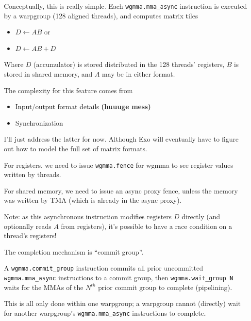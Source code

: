 \newpage
{}

\begin{minipage}[t]{0.5\textwidth}\fixminipage
Conceptually, this is really simple.
Each \texttt{wgmma.mma\_async} instruction is executed by a warpgroup (128 aligned threads), and computes matrix tiles
\begin{itemize}
  \item $D \leftarrow AB$ or
  \item $D \leftarrow AB + D$
\end{itemize}
Where $D$ (accumulator) is stored distributed in the 128 threads' registers, $B$ is stored in shared memory, and $A$ may be in either format.

The complexity for this feature comes from
\begin{itemize}
  \item Input/output format details \textbf{(huuuge mess)}
  \item Synchronization
\end{itemize}
I'll just address the latter for now.
Although Exo will eventually have to figure out how to model the full set of matrix formats.
\end{minipage}
\hfill
\begin{minipage}[t]{0.5\textwidth}\fixminipage
{}

For registers, we need to issue \texttt{wgmma.fence} for wgmma to see register values written by threads.

For shared memory, we need to issue an async proxy fence, unless the memory was written by TMA (which is already in the async proxy).

Note: as this asynchronous instruction modifies registers $D$ directly (and optionally reads $A$ from registers), it's possible to have a race condition on a thread's registers!


The completion mechanism is ``commit group''.

A \texttt{wgmma.commit\_group} instruction commits all prior uncommitted \texttt{wgmma.mma\_async} instructions to a commit group, then \texttt{wgmma.wait\_group N} waits for the MMAs of the $N^{th}$ prior commit group to complete (pipelining).

This is all only done within one warpgroup; a warpgroup cannot (directly) wait for another warpgroup's \texttt{wgmma.mma\_async} instructions to complete.
\end{minipage}


